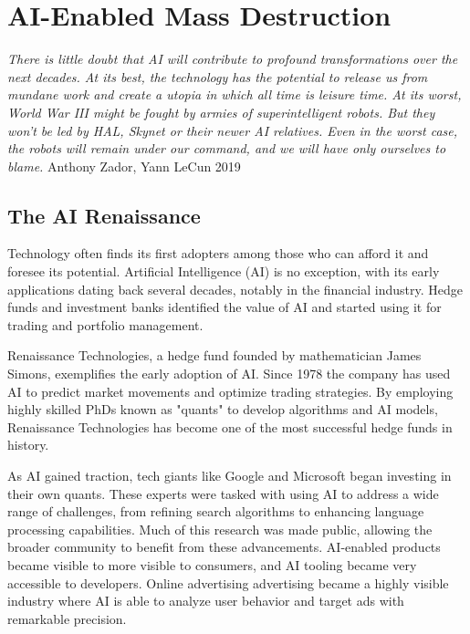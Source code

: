 \setchapterpreamble[u]{\margintoc}
\chapter{AI-Enabled Mass Destruction}

\textit{There is little doubt that AI will contribute to profound transformations over the next decades. At its best, the technology has the potential to release us from mundane work and create a utopia in which all time is leisure time. At its worst, World War III might be fought by armies of superintelligent robots. But they won’t be led by HAL, Skynet or their newer AI relatives. Even in the worst case, the robots will remain under our command, and we will have only ourselves to blame.} Anthony Zador, Yann LeCun 2019 \cite{dontfearterminator}


\section{The AI Renaissance}

Technology often finds its first adopters among those who can afford it and foresee its potential. Artificial Intelligence (AI) is no exception, with its early applications dating back several decades, notably in the financial industry. Hedge funds and investment banks identified the value of AI and started using it for trading and portfolio management.

Renaissance Technologies, a hedge fund founded by mathematician James Simons, exemplifies the early adoption of AI. Since 1978 the company has used AI to predict market movements and optimize trading strategies. By employing highly skilled PhDs known as "quants" to develop algorithms and AI models, Renaissance Technologies has become one of the most successful hedge funds in history.

As AI gained traction, tech giants like Google and Microsoft began investing in their own quants. These experts were tasked with using AI to address a wide range of challenges, from refining search algorithms to enhancing language processing capabilities. Much of this research was made public, allowing the broader community to benefit from these advancements. AI-enabled products became visible to more visible to consumers, and AI tooling became very accessible to developers. Online advertising advertising became a highly visible industry where AI is able to analyze user behavior and target ads with remarkable precision. 

